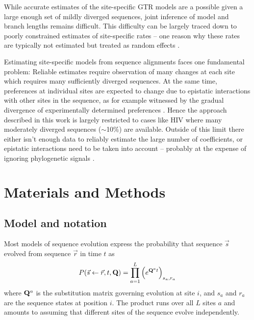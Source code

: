 \documentclass[aps,rmp,twocolumn]{revtex4}
\newcommand{\bq}{\begin{equation}}
\newcommand{\eq}{\end{equation}}
\newcommand{\mat}[1]{{\bf #1}}
\begin{document}
While accurate estimates of the site-specific GTR models are a possible given a large enough set of mildly diverged sequences, joint inference of model and branch lengths remains difficult.
This difficulty can be largely traced down to poorly constrained estimates of site-specific rates -- one  reason why these rates are typically not estimated but treated as random effects \citep{yang1996among}.

Estimating site-specific models from sequence alignments faces one fundamental problem:
Reliable estimates require observation of many changes at each site which requires many sufficiently diverged sequences.
At the same time, preferences at individual sites are expected to change due to epistatic interactions with other sites in the sequence, as for example witnessed by the gradual divergence of experimentally determined preferences \citep{doud_site-specific_2015,haddox_mapping_2018}.
Hence the approach described in this work is largely restricted to cases like HIV where many moderately diverged sequences ($\sim$10\%) are available.
Outside of this limit there either isn't enough data to reliably estimate the large number of coefficients, or epistatic interactions need to be taken into account -- probably at the expense of ignoring phylogenetic signals \citep{morcos_direct-coupling_2011}.




\onecolumngrid

\section*{Materials and Methods}
\subsection*{Model and notation}
\label{sec:MM_model}
Most models of sequence evolution express the probability that sequence $\vec{s}$ evolved from sequence $\vec{r}$ in time $t$ as
\bq
P(\vec{s}\leftarrow \vec{r},t,\mat{Q}) = \prod_{a=1}^L \left(e^{\mat{Q}^{a} t}\right)_{s_{a},r_{a}}
\label{eq:P_prob}
\eq
where $\mat{Q}^{a}$ is the substitution matrix governing evolution at site $i$, and $s_{a}$ and $r_{a}$ are the sequence states at position $i$.
The product runs over all $L$ sites $a$ and amounts to assuming that different sites of the sequence evolve independently.
\end{document}
